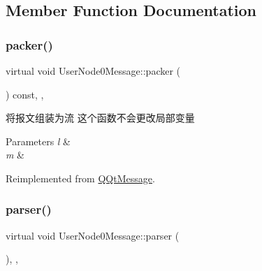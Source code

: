 \subsection{Member Function Documentation}
\mbox{\label{class_user_node0_message_af4ceb228dafb4a573ec54c89fa1075f5}} 
\subsubsection{\texorpdfstring{packer()}{packer()}}
{\footnotesize\ttfamily virtual void User\+Node0\+Message\+::packer (\begin{DoxyParamCaption}\item[{Q\+Byte\+Array \&}]{ }\end{DoxyParamCaption}) const\hspace{0.3cm}{\ttfamily [inline]}, {\ttfamily [override]}, {\ttfamily [virtual]}}



将报文组装为流 这个函数不会更改局部变量 


\begin{DoxyParams}{Parameters}
{\em l} & \\
\hline
{\em m} & \\
\hline
\end{DoxyParams}


Reimplemented from \mbox{\hyperlink{class_q_qt_message_af1885c2c3628495808dca66ee8d72e14}{Q\+Qt\+Message}}.

\mbox{\label{class_user_node0_message_a867122dceecf61ef1b09c30b95806914}} 
\subsubsection{\texorpdfstring{parser()}{parser()}}
{\footnotesize\ttfamily virtual void User\+Node0\+Message\+::parser (\begin{DoxyParamCaption}\item[{const Q\+Byte\+Array \&}]{ }\end{DoxyParamCaption})\hspace{0.3cm}{\ttfamily [inline]}, {\ttfamily [override]}, {\ttfamily [virtual]}}



